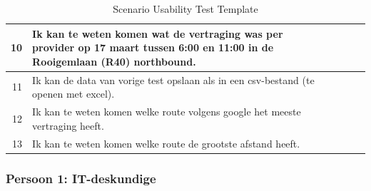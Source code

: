 \begin{table}[H]
\begin{tabular}{|r|l|l|l|l|l|}
10 & \multicolumn{1}{p{9cm}|}{Ik kan te weten komen wat de vertraging was per provider op 17 maart tussen 6:00 en 11:00 in de Rooigemlaan (R40) northbound.} & \multicolumn{1}{c|}{}      
&  &  \\ \hline

11 & \multicolumn{1}{p{9cm}|}{Ik kan de data van vorige test opslaan als in een csv-bestand (te openen met excel).} & \multicolumn{1}{c|}{}      
&  &  \\ \hline

12 & \multicolumn{1}{p{9cm}|}{Ik kan te weten komen welke route volgens google het meeste vertraging heeft.} & \multicolumn{1}{c|}{}      
&  &  \\ \hline

13 & \multicolumn{1}{p{9cm}|}{Ik kan te weten komen welke route de grootste afstand heeft.} & \multicolumn{1}{c|}{}      
&  &  \\ \hline

\end{tabular}
\caption{Scenario Usability Test Template}
\end{table}


\subsubsection{Persoon 1: IT-deskundige}

